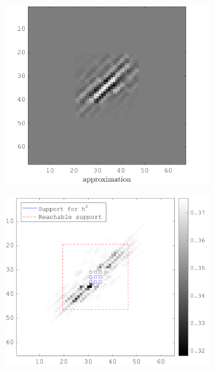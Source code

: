 \begin{figure}[!h]
\begin{subfigure}[b]{0.49\textwidth}
\includegraphics[width=\textwidth]{figures/xp/xp_128x128_sc2_angl1_K3_S3_node2_approx.png}
\end{subfigure}
   \begin{subfigure}[b]{0.49\textwidth}\centering
    \includegraphics[width=\textwidth]{figures/xp/xp_128x128_sc2_angl1_K3_S3_node2_obj_matrix.png}
    \end{subfigure}
    \begin{subfigure}[b]{0.49\textwidth}\centering

\end{subfigure}
\end{figure}
